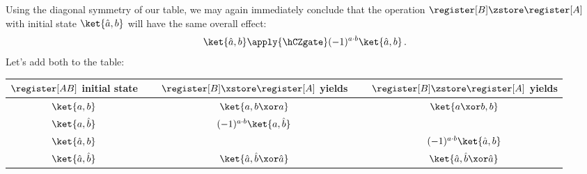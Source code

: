       Using the diagonal symmetry of our table, we may again immediately
        conclude that the operation $\register[B] \zstore \register[A]$ with
        initial state $\ket{\hat a, b}$ will have the same overall effect:
      \[
        \ket{\hat a, b} \apply{\hCZgate} (-1)^{a \cdot b}\ket{\hat a, b}\, .
      \]
      Let's add both to the table:
      \begin{steptable}
        \centering
        \setlength{\extrarowheight}{2pt}
        \begin{tabular}{ccc}
          \toprule
          $\register[AB]$ initial state & 
            $\quad$ $\register[B] \xstore \register[A]$ yields $\quad$ & 
            $\register[B] \zstore \register[A]$ yields\\
          \midrule
          $\ket{a,b}$ & $\ket{a,b \xor a}$ & $\ket{a \xor b, b}$ \\
          $\ket{a,\hat b}$ & $(-1)^{a \cdot b} \ket{a, \hat b}$ &  \\
          $\ket{\hat a, b}$ &  & $(-1)^{a \cdot b} \ket{\hat a, b}$ \\
          $\ket{\hat a, \hat b}$ & $\ket{\hat a, \hat b \xor \hat a}$ & $\ket{\hat a, \hat b \xor \hat a}$ \\
          \bottomrule
        \end{tabular}
      \end{steptable}

